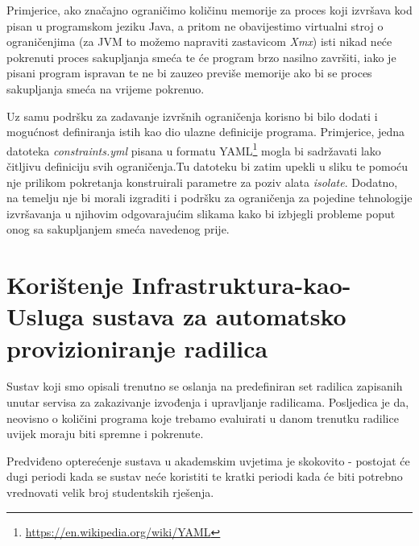 \documentclass[times, utf8, zavrsni]{fer}
\begin{document}
Primjerice, ako značajno ograničimo količinu memorije za proces koji izvršava kod pisan u programskom jeziku Java, a pritom ne obavijestimo virtualni stroj o ograničenjima (za JVM to možemo napraviti zastavicom {\textit{Xmx}}) isti nikad neće pokrenuti proces sakupljanja smeća te će program brzo nasilno završiti, iako je pisani program ispravan te ne bi zauzeo previše memorije ako bi se proces sakupljanja smeća na vrijeme pokrenuo.

Uz samu podršku za zadavanje izvršnih ograničenja korisno bi bilo dodati i mogućnost definiranja istih kao dio ulazne definicije programa. Primjerice, jedna datoteka {\textit{constraints.yml}} pisana u formatu YAML\footnote{\url{https://en.wikipedia.org/wiki/YAML}} mogla bi sadržavati lako čitljivu definiciju svih ograničenja.Tu datoteku bi zatim upekli u sliku te pomoću nje prilikom pokretanja konstruirali parametre za poziv alata {\textit{isolate}}. Dodatno, na temelju nje bi morali izgraditi i podršku za ograničenja za pojedine tehnologije izvršavanja u njihovim odgovarajućim slikama kako bi izbjegli probleme poput onog sa sakupljanjem smeća navedenog prije.


\section{Korištenje Infrastruktura-kao-Usluga sustava za automatsko provizioniranje radilica}

Sustav koji smo opisali trenutno se oslanja na predefiniran set radilica zapisanih unutar servisa za zakazivanje izvođenja i upravljanje radilicama. Posljedica je da, neovisno o količini programa koje trebamo evaluirati u danom trenutku radilice uvijek moraju biti spremne i pokrenute.

Predviđeno opterećenje sustava u akademskim uvjetima je skokovito - postojat će dugi periodi kada se sustav neće koristiti te kratki periodi kada će biti potrebno vrednovati velik broj studentskih rješenja.
\end{document}
